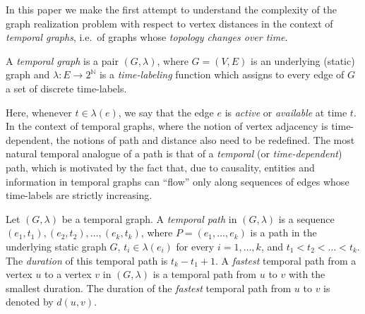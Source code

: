 \documentclass[a4paper,UKenglish,cleveref, autoref, thm-restate, anonymous]{lipics-v2021}
\begin{document}
In this paper we make the first attempt to understand the complexity of the graph realization problem with respect to vertex distances in the context of \emph{temporal graphs}, i.e.~of graphs whose \emph{topology changes over time}. 

\begin{definition}
\label{temp-graph-def} A \emph{temporal graph} is a pair $(G,\lambda)$,
where $G=(V,E)$ is an underlying (static) graph and $\lambda :E\rightarrow 2^\mathbb{N}$ is a \emph{time-labeling} function which assigns to every edge of $G$ a set of discrete time-labels.
\end{definition}

Here, whenever $t \in \lambda(e)$, we say that the edge $e$ is \emph{active} or \emph{available} at time $t$. In the context of temporal graphs, where the notion of vertex adjacency is time-dependent, the notions of path and distance also need to be redefined. The most natural temporal analogue of a path is that of a \emph{temporal} (or \emph{time-dependent}) path, which is motivated by the fact that, due to
causality, entities and information in temporal graphs can ``flow'' only along sequences of
edges whose time-labels are strictly increasing.

\begin{definition} \label{def:temporalPath+Duration}
Let $(G,\lambda)$ be a temporal graph. A \emph{temporal path} 
in $(G,\lambda)$ is a sequence $(e_1,t_1),(e_2,t_2),\ldots,(e_k,t_k)$, 
where $P=(e_1,\ldots,e_k)$ is a path in the underlying static graph $G$, 
$t_i\in \lambda(e_i)$ for every $i=1,\ldots,k$, and $t_1<t_2<\ldots<t_k$. 
The \emph{duration} of this temporal path %
is $t_k - t_1 + 1$.
A \emph{fastest} temporal path from a vertex $u$ to a vertex $v$ in $(G,\lambda)$ is a temporal path from $u$ to $v$ with the smallest duration.
The duration of the \emph{fastest} temporal path from $u$ to $v$ is denoted by $d(u,v)$.
\end{definition}

\end{document}
